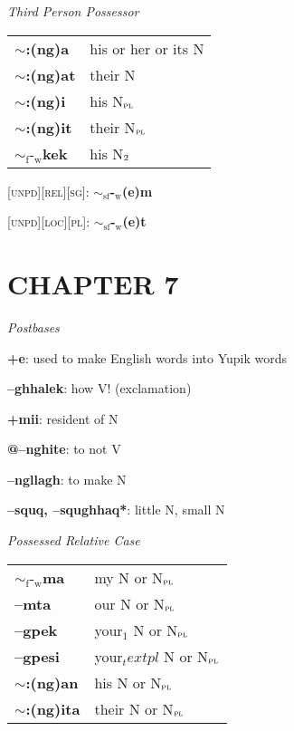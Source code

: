 \documentclass{article}
\begin{document}
\textit{Third Person Possessor} \\
\begin{tabular}{ l l }
\textbf{$\sim$:(ng)a} & his or her or its N \\
\textbf{$\sim$:(ng)at} & their N \\
\textbf{$\sim$:(ng)i} & his N$_\text{\textsc{pl}}$ \\
\textbf{$\sim$:(ng)it} & their N$_\text{\textsc{pl}}$ \\
\textbf{${\sim}_\text{f}\text{-}_\text{w}$kek} & his N$_\text{\textsc{2}}$ \\
\end{tabular}

\bigskip

\textsc{[unpd][rel][sg]}: \textbf{$\sim_\text{sf}$-$_\text{w}$(e)m}

\textsc{[unpd][loc][pl]}: \textbf{$\sim_\text{sf}$-$_\text{w}$(e)t}

\section{CHAPTER 7}

\textit{Postbases}
\begin{description}
\item \textbf{+e}: used to make English words into Yupik words
\item \textbf{--ghhalek}: how V! (exclamation)
\item \textbf{+mii}: resident of N
\item \textbf{@--nghite}: to not V
\item \textbf{--ngllagh}: to make N
\item \textbf{--squq, --squghhaq*}: little N, small N
\end{description}

\bigskip

\textit{Possessed Relative Case} \\
\begin{tabular}{ l l }
\textbf{$\sim_\text{f}\text{-}_\text{w}$ma} & my N or N$_\text{\textsc{pl}}$ \\
\textbf{--mta} &  our N or N$_\text{\textsc{pl}}$\\
\textbf{--gpek} & your$_1$ N or N$_\text{\textsc{pl}}$ \\
\textbf{--gpesi} & your$_text{pl}$ N or N$_\text{\textsc{pl}}$ \\
\textbf{$\sim$:(ng)an} & his N or N$_\text{\textsc{pl}}$ \\
\textbf{$\sim$:(ng)ita} & their N or N$_\text{\textsc{pl}}$ \\
\end{tabular}
\end{document}
